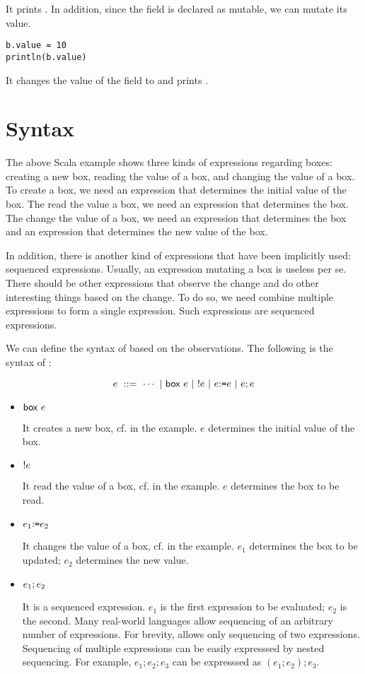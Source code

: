 It prints .
In addition, since the field  is declared as mutable, we can mutate
its value.

\begin{verbatim}
b.value = 10
println(b.value)
\end{verbatim}

It changes the value of the field to  and prints .

\section{Syntax}

The above Scala example shows three kinds of expressions regarding boxes:
creating a new box, reading the value of a box, and changing the value of a box.
To create a box, we need an expression that determines the initial value of the
box. The read the value a box, we need an expression that determines the box.
The change the value of a box, we need an expression that determines the box and
an expression that determines the new value of the box.

In addition, there is another kind of expressions that have been implicitly
used: sequenced expressions. Usually, an expression mutating a box is useless
per se. There should be other expressions that observe the change and do
other interesting things based on the change. To do so, we need combine
multiple expressions to form a single expression. Such expressions are sequenced
expressions.

We can define the syntax of \lang based on the observations.
The following is the syntax of \lang:

\[
  e\ ::=\ \cdots\ |\ \eref{e}\ |\ \ederef{e}\ |\ \eset{e}{e}\ |\ \eseq{e}{e}
\]

\begin{itemize}
  \item $\textsf{box}\ e$

    It creates a new box, cf.  in the example.
    $e$ determines the initial value of the box.

  \item $!e$

    It read the value of a box, cf.  in the example.
    $e$ determines the box to be read.

  \item $e_1{:}\texttt{=} e_2$

    It changes the value of a box, cf.  in the example.
    $e_1$ determines the box to be updated; $e_2$ determines the new value.

  \item $e_1;e_2$

    It is a sequenced expression. $e_1$ is the first expression to be
    evaluated; $e_2$ is the second. Many real-world languages allow sequencing
    of an arbitrary number of expressions. For brevity, \lang allows only
    sequencing of two expressions. Sequencing of multiple expressions can be
    easily expresssed by nested sequencing. For example, $e_1;e_2;e_3$ can be
    expresssed as $(e_1;e_2);e_3$.
\end{itemize}

